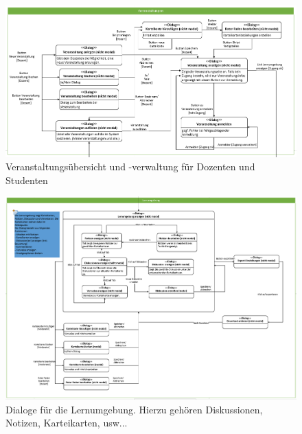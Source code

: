 \documentclass[12pt,a4paper]{article}
\begin{document}
{\begin{landscape}
\begin{figure}[H]
	\centering
	\includegraphics[width=25cm]{Bilder/Mockups/DSDVeranstaltungen.png}
	\caption{Veranstaltungsübersicht und -verwaltung für Dozenten und Studenten}
	\label{DSDVeranstaltung}
\end{figure}

\begin{figure}[H]
	\centering
	\includegraphics[width=25cm]{Bilder/Mockups/DSDLernumgebung.png}
	\caption{Dialoge für die Lernumgebung. Hierzu gehören Diskussionen, Notizen, Karteikarten, usw...}
	\label{DSDLernumgebung}
\end{figure}

\end{landscape}

\begin{figure}[H]
	\centering

\end{figure}}
\end{document}
